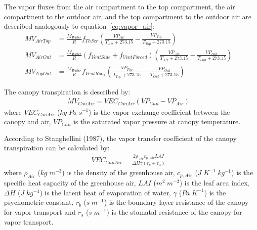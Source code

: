 \documentclass[a4paper]{article}
\begin{document}
The vapor fluxes from the air compartment to the top compartment, the air compartment to the outdoor air, and the top compartment to the outdoor air are described analogously to equation~\eqref{eq:vapor_air}:
\begin{align}
  MV_{AirTop} & = \frac{M_{Water}}{R} f_{ThScr} \left(\frac{VP_{Air}}{T_{Air} + 273.15} - \frac{VP_{Top}}{T_{Top} + 273.15}\right)                       \\
  MV_{AirOut} & = \frac{M_{Water}}{R} (f_{VentSide} + f_{VentForced}) \left(\frac{VP_{Air}}{T_{Air} + 273.15} - \frac{VP_{Out}}{T_{Out} + 273.15}\right) \\
  MV_{TopOut} & = \frac{M_{Water}}{R} f_{VentRoof} \left(\frac{VP_{Top}}{T_{Top} + 273.15} - \frac{VP_{Out}}{T_{Out} + 273.15}\right)
\end{align}

The canopy transpiration is described by:
\begin{align}
  MV_{CanAir} = VEC_{CanAir}(VP_{Can} - VP_{Air})
\end{align}
where \(VEC_{CanAir}\) (\(kg\;Pa\;s^{-1}\)) is the vapor exchange coefficient between the canopy and air, \(VP_{Can}\) is the saturated vapor pressure at canopy temperature.

According to Stanghellini (1987), the vapor transfer coefficient of the canopy transpiration can be calculated by:
\begin{align}
  VEC_{CanAir} = \frac{2 \rho_{Air} c_{p,Air}LAI}{\Delta H \gamma (r_b + r_s)}
\end{align}
where \(\rho_{Air}\) (\(kg\;m^{-3}\)) is the density of the greenhouse air, \(c_{p,Air}\) (\(J\;K^{-1}\;kg^{-1}\)) is the specific heat capacity of the greenhouse air, \(LAI\) (\(m^2\;m^{-2}\)) is the leaf area index, \(\Delta H\) (\(J\;kg^{-1}\)) is the latent heat of evaporation of water, \(\gamma\) (\(Pa\;K^{-1}\)) is the psychometric constant, \(r_b\) (\(s\;m^{-1}\)) is the boundary layer resistance of the canopy for vapor transport and \(r_s\) (\(s\;m^{-1}\)) is the stomatal resistance of the canopy for vapor transport.
\end{document}
